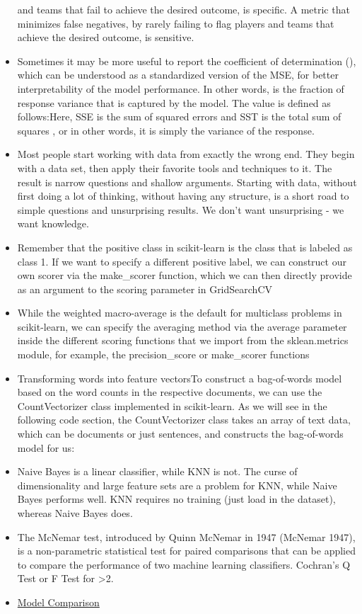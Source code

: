 \documentclass[]{book}
\theoremstyle{definition}
\theoremstyle{definition}
\theoremstyle{definition}
\theoremstyle{remark}
\begin{document}
\begin{itemize}
  and teams that fail to achieve the desired outcome, is specific. A
  metric that minimizes false negatives, by rarely failing to flag
  players and teams that achieve the desired outcome, is sensitive.
\item
  Sometimes it may be more useful to report the coefficient of
  determination (), which can be understood as a standardized version of
  the MSE, for better interpretability of the model performance. In
  other words, is the fraction of response variance that is captured by
  the model. The value is defined as follows:Here, SSE is the sum of
  squared errors and SST is the total sum of squares , or in other
  words, it is simply the variance of the response.
\item
  Most people start working with data from exactly the wrong end. They
  begin with a data set, then apply their favorite tools and techniques
  to it. The result is narrow questions and shallow arguments. Starting
  with data, without first doing a lot of thinking, without having any
  structure, is a short road to simple questions and unsurprising
  results. We don't want unsurprising - we want knowledge.
\item
  Remember that the positive class in scikit-learn is the class that is
  labeled as class 1. If we want to specify a different positive label,
  we can construct our own scorer via the make\_scorer function, which
  we can then directly provide as an argument to the scoring parameter
  in GridSearchCV
\item
  While the weighted macro-average is the default for multiclass
  problems in scikit-learn, we can specify the averaging method via the
  average parameter inside the different scoring functions that we
  import from the sklean.metrics module, for example, the
  precision\_score or make\_scorer functions
\item
  Transforming words into feature vectorsTo construct a bag-of-words
  model based on the word counts in the respective documents, we can use
  the CountVectorizer class implemented in scikit-learn. As we will see
  in the following code section, the CountVectorizer class takes an
  array of text data, which can be documents or just sentences, and
  constructs the bag-of-words model for us:
\item
  Naive Bayes is a linear classifier, while KNN is not. The curse of
  dimensionality and large feature sets are a problem for KNN, while
  Naive Bayes performs well. KNN requires no training (just load in the
  dataset), whereas Naive Bayes does.
\item
  The McNemar test, introduced by Quinn McNemar in 1947 (McNemar 1947),
  is a non-parametric statistical test for paired comparisons that can
  be applied to compare the performance of two machine learning
  classifiers. Cochran's Q Test or F Test for \textgreater{}2.
\item
  \href{http://hunch.net/?p=224}{Model Comparison}
\end{itemize}
\end{document}
